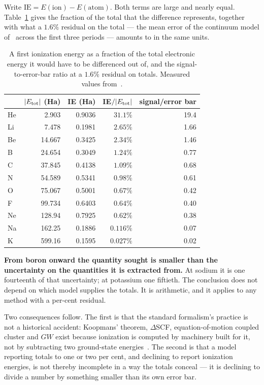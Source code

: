 \documentclass[11pt]{article}
\begin{document}
Write $\mathrm{IE} = E(\mathrm{ion}) - E(\mathrm{atom})$. Both terms are large and nearly
equal. Table~\ref{tab:frac} gives the fraction of the total that the difference represents,
together with what a $1.6\%$ residual on the total --- the mean error of the continuum model
of~\cite{Johnson-atoms} across the first three periods --- amounts to in the same units.

\begin{table}[t]
\centering
\caption{A first ionization energy as a fraction of the total electronic energy it would have
to be differenced out of, and the signal-to-error-bar ratio at a $1.6\%$ residual on totals.
Measured values from~\cite{NIST}.}
\label{tab:frac}
\begin{tabular}{lrrrr}
\toprule
 & $|E_{\rm tot}|$ (Ha) & IE (Ha) & IE$/|E_{\rm tot}|$ & signal/error bar \\
\midrule
He & 2.903  & 0.9036 & $31.1\%$  & 19.4 \\
Li & 7.478  & 0.1981 & $2.65\%$  & 1.66 \\
Be & 14.667 & 0.3425 & $2.34\%$  & 1.46 \\
B  & 24.654 & 0.3049 & $1.24\%$  & 0.77 \\
C  & 37.845 & 0.4138 & $1.09\%$  & 0.68 \\
N  & 54.589 & 0.5341 & $0.98\%$  & 0.61 \\
O  & 75.067 & 0.5001 & $0.67\%$  & 0.42 \\
F  & 99.734 & 0.6403 & $0.64\%$  & 0.40 \\
Ne & 128.94 & 0.7925 & $0.62\%$  & 0.38 \\
Na & 162.25 & 0.1886 & $0.116\%$ & 0.07 \\
K  & 599.16 & 0.1595 & $0.027\%$ & 0.02 \\
\bottomrule
\end{tabular}
\end{table}

\textbf{From boron onward the quantity sought is smaller than the uncertainty on the
quantities it is extracted from.} At sodium it is one fourteenth of that uncertainty; at
potassium one fiftieth. The conclusion does not depend on which model supplies the totals.
It is arithmetic, and it applies to any method with a per-cent residual.

Two consequences follow. The first is that the standard formalism's practice is not a
historical accident: Koopmans' theorem, $\Delta$SCF, equation-of-motion coupled cluster and
$GW$ exist because ionization is computed by machinery built for it, not by subtracting two
ground-state energies~\cite{Koopmans,SzaboOstlund,Hedin}. The second is that a model
reporting totals to one or two per cent, and declining to report ionization energies, is not
thereby incomplete in a way the totals conceal --- it is declining to divide a number by
something smaller than its own error bar.
\end{document}
